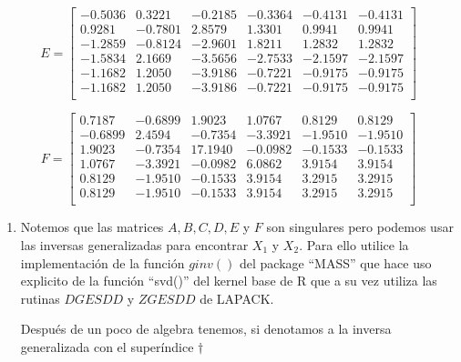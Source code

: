 \documentclass[paper=letter, fontsize=11pt]{scrartcl}
\numberwithin{equation}{section} %
\numberwithin{figure}{section} %
\numberwithin{table}{section} %
\newenvironment{cframed}[1][blue]
  {\begin{tcolorbox}[colframe=#1,colback=white]}
  {\end{tcolorbox}}
\begin{document}
\begin{enumerate}
\begin{cframed}[teal]
\[
E = 
\begin{bmatrix}
-0.5036& 0.3221& -0.2185& -0.3364& -0.4131& -0.4131\\
0.9281& -0.7801& 2.8579& 1.3301& 0.9941& 0.9941\\
-1.2859& -0.8124& -2.9601& 1.8211& 1.2832& 1.2832\\
-1.5834& 2.1669& -3.5656& -2.7533& -2.1597& -2.1597\\
-1.1682& 1.2050& -3.9186& -0.7221& -0.9175& -0.9175\\
-1.1682& 1.2050& -3.9186& -0.7221& -0.9175& -0.9175\\
\end{bmatrix}
\]

\[
F = 
\begin{bmatrix}
0.7187& -0.6899& 1.9023& 1.0767& 0.8129 &0.8129\\
-0.6899& 2.4594& -0.7354& -3.3921& -1.9510 &-1.9510\\
1.9023& -0.7354& 17.1940& -0.0982& -0.1533& -0.1533\\
1.0767& -3.3921& -0.0982& 6.0862& 3.9154 &3.9154\\
0.8129& -1.9510& -0.1533& 3.9154& 3.2915 &3.2915\\
0.8129& -1.9510& -0.1533& 3.9154& 3.2915 &3.2915\\
\end{bmatrix}
\]


\end{cframed}
\begin{enumerate}
\item 
Notemos que las matrices $A,B,C,D,E$ y $F$ son singulares pero podemos usar las inversas generalizadas para encontrar $X_1$ y $X_2$. Para ello utilice la implementación de la función $ginv()$ del package “MASS” que hace uso explicito de la función “svd()” del kernel base de R que a su vez utiliza las rutinas $DGESDD$ y $ZGESDD$ de LAPACK.

Después de un poco de algebra tenemos, si denotamos a la inversa generalizada con el superíndice $\dag$ 


\end{enumerate}
\end{enumerate}
\end{document}
